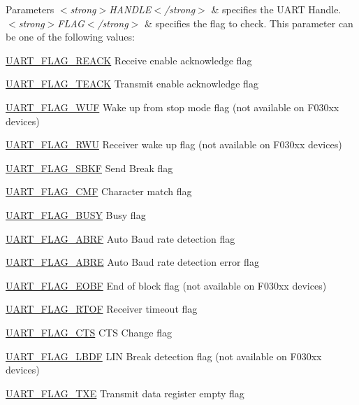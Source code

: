 \begin{DoxyParams}{Parameters}
{\em $<$strong$>$\+H\+A\+N\+D\+L\+E$<$/strong$>$} & specifies the U\+A\+RT Handle. \\
\hline
{\em $<$strong$>$\+F\+L\+A\+G$<$/strong$>$} & specifies the flag to check. This parameter can be one of the following values\+: \begin{DoxyItemize}
\item \hyperlink{group___u_a_r_t___flags_ga18f2d6a153838d8fd53911352a4d87ad}{U\+A\+R\+T\+\_\+\+F\+L\+A\+G\+\_\+\+R\+E\+A\+CK} Receive enable acknowledge flag \item \hyperlink{group___u_a_r_t___flags_gaf4a4ade6fd987ea7f22786269317f94a}{U\+A\+R\+T\+\_\+\+F\+L\+A\+G\+\_\+\+T\+E\+A\+CK} Transmit enable acknowledge flag \item \hyperlink{group___u_a_r_t___flags_gada80ee73404da204801766e42cbf7163}{U\+A\+R\+T\+\_\+\+F\+L\+A\+G\+\_\+\+W\+UF} Wake up from stop mode flag (not available on F030xx devices) \item \hyperlink{group___u_a_r_t___flags_ga5d5f6f91093bfb222baa277a86f6b75b}{U\+A\+R\+T\+\_\+\+F\+L\+A\+G\+\_\+\+R\+WU} Receiver wake up flag (not available on F030xx devices) \item \hyperlink{group___u_a_r_t___flags_gaea7a67e1f6a8af78e2adfaed59d1a4be}{U\+A\+R\+T\+\_\+\+F\+L\+A\+G\+\_\+\+S\+B\+KF} Send Break flag \item \hyperlink{group___u_a_r_t___flags_ga01f2c67d8999a9ee8d91ac3cb5e7fbfe}{U\+A\+R\+T\+\_\+\+F\+L\+A\+G\+\_\+\+C\+MF} Character match flag \item \hyperlink{group___u_a_r_t___flags_ga2d1387d412382a345097acb403748ba3}{U\+A\+R\+T\+\_\+\+F\+L\+A\+G\+\_\+\+B\+U\+SY} Busy flag \item \hyperlink{group___u_a_r_t___flags_ga9e309874f2c8f71e4049ae6cb702a2eb}{U\+A\+R\+T\+\_\+\+F\+L\+A\+G\+\_\+\+A\+B\+RF} Auto Baud rate detection flag \item \hyperlink{group___u_a_r_t___flags_ga87853efaab808377c8acb9e8b671a2e8}{U\+A\+R\+T\+\_\+\+F\+L\+A\+G\+\_\+\+A\+B\+RE} Auto Baud rate detection error flag \item \hyperlink{group___u_a_r_t___flags_ga9578373b2ce868613c5138762dbd2fdd}{U\+A\+R\+T\+\_\+\+F\+L\+A\+G\+\_\+\+E\+O\+BF} End of block flag (not available on F030xx devices) \item \hyperlink{group___u_a_r_t___flags_ga69afec3b174a6b5969e71ea25d973958}{U\+A\+R\+T\+\_\+\+F\+L\+A\+G\+\_\+\+R\+T\+OF} Receiver timeout flag \item \hyperlink{group___u_a_r_t___flags_ga5435edd22ff23de7187654362c48e0b1}{U\+A\+R\+T\+\_\+\+F\+L\+A\+G\+\_\+\+C\+TS} C\+TS Change flag \item \hyperlink{group___u_a_r_t___flags_ga77b81c3c843b49af940862fe4d6ab933}{U\+A\+R\+T\+\_\+\+F\+L\+A\+G\+\_\+\+L\+B\+DF} L\+IN Break detection flag (not available on F030xx devices) \item \hyperlink{group___u_a_r_t___flags_gad39c017d415a7774c82eb07413a9dbe4}{U\+A\+R\+T\+\_\+\+F\+L\+A\+G\+\_\+\+T\+XE} Transmit data register empty flag \item 
\end{DoxyItemize}
\end{DoxyParams}
